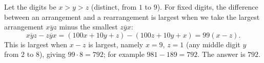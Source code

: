 Let the digits be $x>y>z$ (distinct, from $1$ to $9$). For fixed digits, the difference between an arrangement and a rearrangement is largest when we take the largest arrangement $\overline{xyz}$ minus the smallest $\overline{zyx}$:
\[
\overline{xyz}-\overline{zyx}=(100x+10y+z)-(100z+10y+x)=99(x-z).
\]
This is largest when $x-z$ is largest, namely $x=9$, $z=1$ (any middle digit $y$ from $2$ to $8$), giving $99\cdot8=792$; for example $981-189=792$. The answer is $\boxed{792}$.
